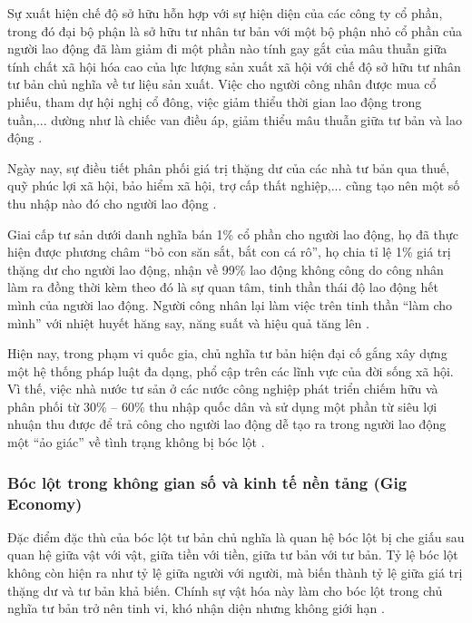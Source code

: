 Sự xuất hiện chế độ sở hữu hỗn hợp với sự hiện diện của các công ty cổ phần, trong đó đại bộ phận là sở hữu tư nhân tư bản với một bộ phận nhỏ cổ phần của người lao động đã làm giảm đi một phần nào tính gay gắt của mâu thuẫn giữa tính chất xã hội hóa cao của lực lượng sản xuất xã hội với chế độ sở hữu tư nhân tư bản chủ nghĩa về tư liệu sản xuất. Việc cho người công nhân được mua cổ phiếu, tham dự hội nghị cổ đông, việc giảm thiểu thời gian lao động trong tuần,... dường như là chiếc van điều áp, giảm thiểu mâu thuẫn giữa tư bản và lao động \cite{tran_hieu_gttd}.

Ngày nay, sự điều tiết phân phối giá trị thặng dư của các nhà tư bản qua thuế, quỹ phúc lợi xã hội, bảo hiểm xã hội, trợ cấp thất nghiệp,... cũng tạo nên một số thu nhập nào đó cho người lao động \cite{tran_hieu_gttd}.

Giai cấp tư sản dưới danh nghĩa bán 1\% cổ phần cho người lao động, họ đã thực hiện được phương châm ``bỏ con săn sắt, bắt con cá rô'', họ chia tỉ lệ 1\% giá trị thặng dư cho người lao động, nhận về 99\% lao động không công do công nhân làm ra đồng thời kèm theo đó là sự quan tâm, tinh thần thái độ lao động hết mình của người lao động. Người công nhân lại làm việc trên tinh thần ``làm cho mình'' với nhiệt huyết hăng say, năng suất và hiệu quả tăng lên \cite{tapchi_congthuong_gttd}.

Hiện nay, trong phạm vi quốc gia, chủ nghĩa tư bản hiện đại cố gắng xây dựng một hệ thống pháp luật đa dạng, phổ cập trên các lĩnh vực của đời sống xã hội. Vì thế, việc nhà nước tư sản ở các nước công nghiệp phát triển chiếm hữu và phân phối từ 30\% -- 60\% thu nhập quốc dân và sử dụng một phần từ siêu lợi nhuận thu được để trả công cho người lao động dễ tạo ra trong người lao động một ``ảo giác'' về tình trạng không bị bóc lột \cite{tran_hieu_gttd}.

\subsubsection{Bóc lột trong không gian số và kinh tế nền tảng (Gig Economy)}

Đặc điểm đặc thù của bóc lột tư bản chủ nghĩa là quan hệ bóc lột bị che giấu sau quan hệ giữa vật với vật, giữa tiền với tiền, giữa tư bản với tư bản. Tỷ lệ bóc lột không còn hiện ra như tỷ lệ giữa người với người, mà biến thành tỷ lệ giữa giá trị thặng dư và tư bản khả biến. Chính sự vật hóa này làm cho bóc lột trong chủ nghĩa tư bản trở nên tinh vi, khó nhận diện nhưng không giới hạn \cite{tran_hieu_gttd}.

